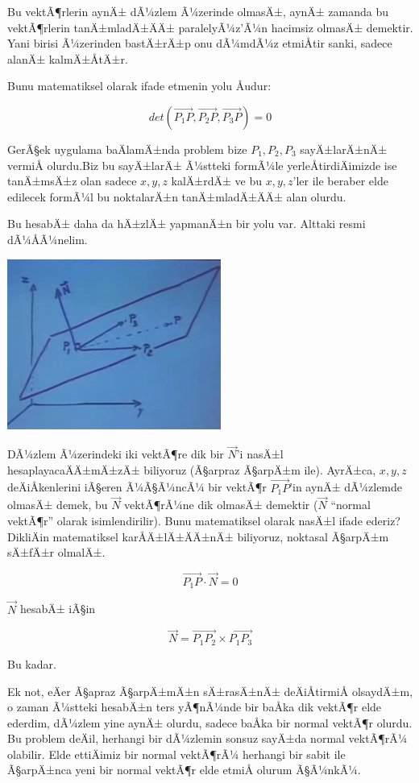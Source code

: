 \documentclass[12pt,fleqn]{article}\usepackage{../../common}
\begin{document}
Bu vektÃ¶rlerin aynÄ± dÃ¼zlem Ã¼zerinde olmasÄ±, aynÄ± zamanda bu vektÃ¶rlerin
tanÄ±mladÄ±ÄÄ± paralelyÃ¼z'Ã¼n hacimsiz olmasÄ± demektir. Yani birisi
Ã¼zerinden bastÄ±rÄ±p onu dÃ¼mdÃ¼z etmiÅtir sanki, sadece alanÄ± kalmÄ±ÅtÄ±r. 

Bunu matematiksel olarak ifade etmenin yolu Åudur:

$$ det(\vec{P_1P},\vec{P_2P},\vec{P_3P}) = 0 $$

GerÃ§ek uygulama baÄlamÄ±nda problem bize $P_1,P_2,P_3$ sayÄ±larÄ±nÄ± vermiÅ
olurdu.Biz bu sayÄ±larÄ± Ã¼stteki formÃ¼le yerleÅtirdiÄimizde ise tanÄ±msÄ±z olan
sadece $x,y,z$ kalÄ±rdÄ± ve bu $x,y,z$'ler ile beraber elde edilecek formÃ¼l bu
noktalarÄ±n tanÄ±mladÄ±ÄÄ± alan olurdu.

Bu hesabÄ± daha da hÄ±zlÄ± yapmanÄ±n bir yolu var. Alttaki resmi dÃ¼ÅÃ¼nelim. 

\begin{center}
\includegraphics[width=7cm]{3_3.png}
\end{center}

DÃ¼zlem Ã¼zerindeki iki vektÃ¶re dik bir $\vec{N}$'i nasÄ±l
hesaplayacaÄÄ±mÄ±zÄ± biliyoruz (Ã§arpraz Ã§arpÄ±m ile). AyrÄ±ca, $x,y,z$
deÄiÅkenlerini iÃ§eren Ã¼Ã§Ã¼ncÃ¼ bir vektÃ¶r $\vec{P_1P}$'in aynÄ± dÃ¼zlemde
olmasÄ± demek, bu $\vec{N}$ vektÃ¶rÃ¼ne dik olmasÄ± demektir ($\vec{N}$
``normal vektÃ¶r'' olarak isimlendirilir). Bunu matematiksel olarak nasÄ±l
ifade ederiz? DikliÄin matematiksel karÅÄ±lÄ±ÄÄ±nÄ± biliyoruz, noktasal Ã§arpÄ±m
sÄ±fÄ±r olmalÄ±.

$$ \vec{P_1P} \cdot \vec{N} = 0 $$

$\vec{N}$ hesabÄ± iÃ§in 

$$ \vec{N} = \vec{P_1P_2} \times \vec{P_1P_3}$$

Bu kadar. 

Ek not, eÄer Ã§apraz Ã§arpÄ±mÄ±n sÄ±rasÄ±nÄ± deÄiÅtirmiÅ olsaydÄ±m, o zaman Ã¼stteki
hesabÄ±n ters yÃ¶nÃ¼nde bir baÅka dik vektÃ¶r elde ederdim, dÃ¼zlem yine aynÄ±
olurdu, sadece baÅka bir normal vektÃ¶r olurdu. Bu problem deÄil, herhangi
bir dÃ¼zlemin sonsuz sayÄ±da normal vektÃ¶rÃ¼ olabilir. Elde ettiÄimiz bir
normal vektÃ¶rÃ¼ herhangi bir sabit ile Ã§arpÄ±nca yeni bir normal vektÃ¶r elde
etmiÅ olurum Ã§Ã¼nkÃ¼. 
\end{document}
